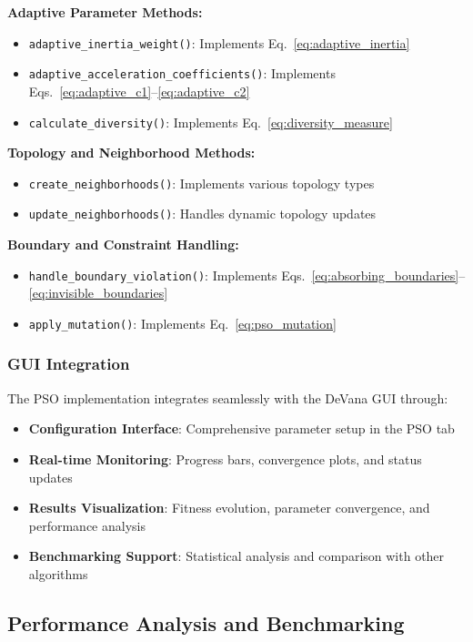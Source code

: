 \documentclass[12pt,a4paper]{article}
\begin{document}
\textbf{Adaptive Parameter Methods:}
\begin{itemize}
    \item \texttt{adaptive\_inertia\_weight()}: Implements Eq.~\eqref{eq:adaptive_inertia}
    \item \texttt{adaptive\_acceleration\_coefficients()}: Implements Eqs.~\eqref{eq:adaptive_c1}--\eqref{eq:adaptive_c2}
    \item \texttt{calculate\_diversity()}: Implements Eq.~\eqref{eq:diversity_measure}
\end{itemize}

\textbf{Topology and Neighborhood Methods:}
\begin{itemize}
    \item \texttt{create\_neighborhoods()}: Implements various topology types
    \item \texttt{update\_neighborhoods()}: Handles dynamic topology updates
\end{itemize}

\textbf{Boundary and Constraint Handling:}
\begin{itemize}
    \item \texttt{handle\_boundary\_violation()}: Implements Eqs.~\eqref{eq:absorbing_boundaries}--\eqref{eq:invisible_boundaries}
    \item \texttt{apply\_mutation()}: Implements Eq.~\eqref{eq:pso_mutation}
\end{itemize}

\subsubsection{GUI Integration}

The PSO implementation integrates seamlessly with the DeVana GUI through:

\begin{itemize}
    \item \textbf{Configuration Interface}: Comprehensive parameter setup in the PSO tab
    \item \textbf{Real-time Monitoring}: Progress bars, convergence plots, and status updates
    \item \textbf{Results Visualization}: Fitness evolution, parameter convergence, and performance analysis
    \item \textbf{Benchmarking Support}: Statistical analysis and comparison with other algorithms
\end{itemize}

\subsection{Performance Analysis and Benchmarking}
\end{document}
